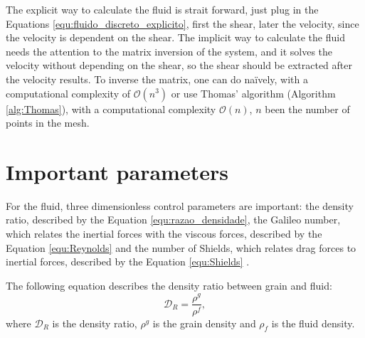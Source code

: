 

    The explicit way to calculate the fluid is strait forward, just plug in the Equations \ref{equ:fluido_discreto_explicito}, first the shear, later the velocity, since the velocity is dependent on the shear. The implicit way to calculate the fluid needs the attention to the matrix inversion of the system, and it solves the velocity without depending on the shear, so the shear should be extracted after the velocity results. To inverse the matrix, one can do naïvely, with a computational complexity of $\mathcal{O}(n^3)$ or use Thomas' algorithm (Algorithm \ref{alg:Thomas}), with a computational complexity $\mathcal{O}(n)$, $n$ been the number of points in the mesh.



\section{Important parameters}
    For the fluid, three dimensionless control parameters are important: the density ratio, described by the Equation \ref{equ:razao_densidade}, the Galileo number, which relates the inertial forces with the viscous forces, described by the Equation \ref{equ:Reynolds} and the number of Shields, which relates drag forces to inertial forces, described by the Equation \ref{equ:Shields} \cite{Numerical_simulation_of_turbulent_sediment_transport}.

    The following equation describes the density ratio between grain and fluid:
\begin{equation}
    \label{equ:razao_densidade}
    \mathcal{D}_{R} = \frac{\rho^{g}}{\rho^{f}},
\end{equation}
where $\mathcal{D}_{R}$ is the density ratio, $\rho^{g}$ is the grain density and $\rho_f$ is the fluid density.


